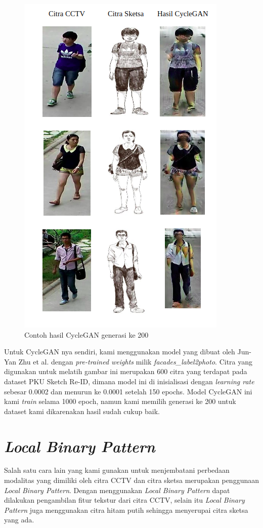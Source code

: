 \begin{figure}  [!htb]
	\centering
	\includegraphics[scale=0.35]{img/CycleGANresults.png}
	\caption{Contoh hasil CycleGAN generasi ke 200}
	\label{fig: 3_3}
\end{figure}

Untuk CycleGAN nya sendiri, kami menggunakan model yang dibuat oleh Jun-Yan Zhu et al. dengan \textit{pre-trained weights} milik \textit{facades\_label2photo}. Citra yang digunakan untuk melatih gambar ini merupakan 600 citra yang terdapat pada dataset PKU Sketch Re-ID, dimana model ini di inisialisasi dengan \textit{learning rate} sebesar 0.0002 dan menurun ke 0.0001 setelah 150 epochs. Model CycleGAN ini kami \textit{train} selama 1000 epoch, namun kami memilih generasi ke 200 untuk dataset kami dikarenakan hasil sudah cukup baik.

\section{\textit{Local Binary Pattern}}
\vspace{1ex}
Salah satu cara lain yang kami gunakan untuk menjembatani perbedaan modalitas yang dimiliki oleh citra CCTV dan citra sketsa merupakan penggunaan \textit{Local Binary Pattern}. Dengan menggunakan \textit{Local Binary Pattern} dapat dilakukan pengambilan fitur tekstur dari citra CCTV, selain itu \textit{Local Binary Pattern} juga menggunakan citra hitam putih sehingga menyerupai citra sketsa yang ada.

